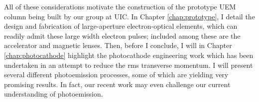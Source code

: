 All of these considerations motivate the construction of the prototype UEM column being built by our group at UIC.
In Chapter \ref{chap:prototype}, I detail the design and fabrication of large-aperture electron-optical elements, which can readily admit these large width electron pulses; included among these are the accelerator and magnetic lenses.
Then, before I conclude, I will in Chapter \ref{chap:photocathode} highlight the photocathode engineering work which has been undertaken in an attempt to reduce the rms transverse momentum.
I will present several different photoemission processes, some of which are yielding very promising results.
In fact, our recent work may even challenge our current understanding of photoemission.

